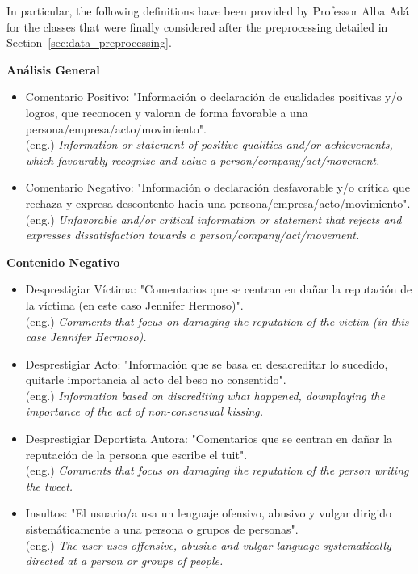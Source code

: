 In particular, the following definitions have been provided by Professor Alba Adá for the classes that were finally considered after the preprocessing detailed in Section~\ref{sec:data_preprocessing}.

\textbf{Análisis General}
\begin{itemize}
    \item Comentario Positivo: "Información o declaración de cualidades positivas y/o logros, que reconocen y valoran de forma favorable a una persona/empresa/acto/movimiento".\\
    (eng.) \textit{Information or statement of positive qualities and/or achievements, which favourably recognize and value a person/company/act/movement.}
    
    \item Comentario Negativo: "Información o declaración desfavorable y/o crítica que rechaza y expresa descontento hacia una persona/empresa/acto/movimiento".\\
    (eng.) \textit{Unfavorable and/or critical information or statement that rejects and expresses dissatisfaction towards a person/company/act/movement.}
\end{itemize}

\textbf{Contenido Negativo}
\begin{itemize}
    \item Desprestigiar Víctima: "Comentarios que se centran en dañar la reputación de la víctima (en este caso Jennifer Hermoso)".\\
    (eng.) \textit{Comments that focus on damaging the reputation of the victim (in this case Jennifer Hermoso).}
    
    \item Desprestigiar Acto: "Información que se basa en desacreditar lo sucedido, quitarle importancia al acto del beso no consentido".\\
    (eng.) \textit{Information based on discrediting what happened, downplaying the importance of the act of non-consensual kissing.}
    
    \item Desprestigiar Deportista Autora: "Comentarios que se centran en dañar la reputación de la persona que escribe el tuit".\\
    (eng.) \textit{Comments that focus on damaging the reputation of the person writing the tweet.}
    
    \item Insultos: "El usuario/a usa un lenguaje ofensivo, abusivo y vulgar dirigido sistemáticamente a una persona o grupos de personas".\\
    (eng.) \textit{The user uses offensive, abusive and vulgar language systematically directed at a person or groups of people.}
\end{itemize}

